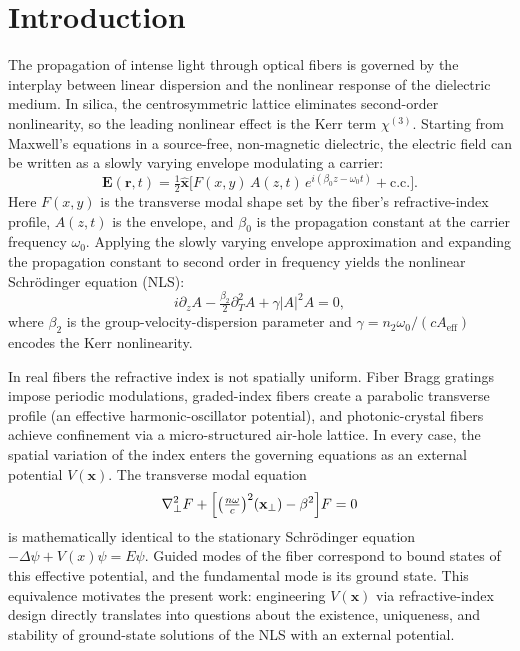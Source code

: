 \documentclass[11pt]{article}
\theoremstyle{plain}%
\theoremstyle{definition}%
\theoremstyle{definition}%
\theoremstyle{remark}%
\numberwithin{equation}{section}
\begin{document}
\tableofcontents

\section{Introduction}\label{sec:intro}

The propagation of intense light through optical fibers is governed by the interplay between linear dispersion and the nonlinear response of the dielectric medium. In silica, the centrosymmetric lattice eliminates second-order nonlinearity, so the leading nonlinear effect is the Kerr term $\chi^{(3)}$. Starting from Maxwell's equations in a source-free, non-magnetic dielectric, the electric field can be written as a slowly varying envelope modulating a carrier:
\[
\mathbf{E}(\mathbf{r},t)=\tfrac{1}{2}\hat{\mathbf{x}}\bigl[F(x,y)\,A(z,t)\,e^{i(\beta_0 z-\omega_0 t)}+\text{c.c.}\bigr].
\]
Here $F(x,y)$ is the transverse modal shape set by the fiber's refractive-index profile, $A(z,t)$ is the envelope, and $\beta_0$ is the propagation constant at the carrier frequency $\omega_0$. Applying the slowly varying envelope approximation and expanding the propagation constant to second order in frequency yields the nonlinear Schr\"odinger equation (NLS):
\[
i\partial_z A - \tfrac{\beta_2}{2}\partial_T^2 A + \gamma|A|^2 A = 0,
\]
where $\beta_2$ is the group-velocity-dispersion parameter and $\gamma=n_2\omega_0/(cA_{\text{eff}})$ encodes the Kerr nonlinearity.

In real fibers the refractive index is not spatially uniform. Fiber Bragg gratings impose periodic modulations, graded-index fibers create a parabolic transverse profile (an effective harmonic-oscillator potential), and photonic-crystal fibers achieve confinement via a micro-structured air-hole lattice. In every case, the spatial variation of the index enters the governing equations as an external potential $V(\mathbf{x})$. The transverse modal equation
\[
\nabla_\perp^2 F + \Bigl[\bigl(\tfrac{n\omega}{c}\bigr)^2(\mathbf{x}_\perp) - \beta^2\Bigr]F = 0
\]
is mathematically identical to the stationary Schr\"odinger equation $-\Delta\psi + V(x)\psi = E\psi$. Guided modes of the fiber correspond to bound states of this effective potential, and the fundamental mode is its ground state. This equivalence motivates the present work: engineering $V(\mathbf{x})$ via refractive-index design directly translates into questions about the existence, uniqueness, and stability of ground-state solutions of the NLS with an external potential.
\end{document}
